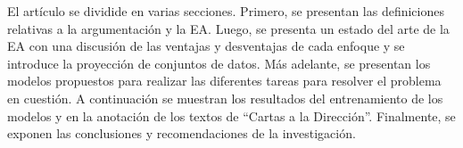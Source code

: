 \documentclass[a4paper,11pt,twocolumn,twoside]{article}
\begin{document}



El artículo se dividide en varias secciones. Primero, se presentan las definiciones 
relativas a la argumentación y la EA. Luego, se presenta 
un estado del arte de la EA con una discusión de las
ventajas y desventajas de cada enfoque y se introduce la proyección de conjuntos de datos. Más adelante, 
se presentan los modelos propuestos para realizar las diferentes tareas para resolver el problema en 
cuestión. A continuación se muestran los resultados del entrenamiento de los modelos y en 
la anotación de los textos de ``Cartas a la Dirección''. Finalmente, se exponen las conclusiones y 
recomendaciones de la investigación.
\end{document}

